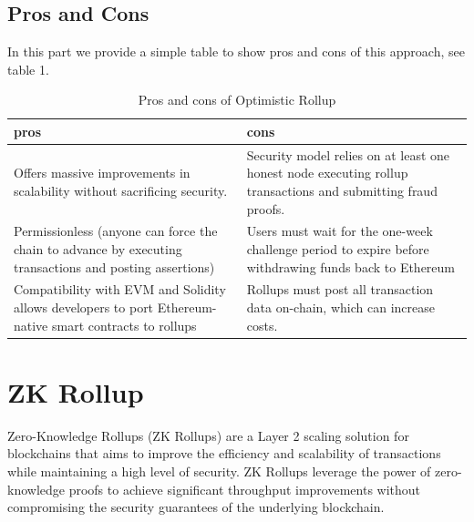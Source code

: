\subsection{Pros and Cons}
In this part we provide a simple table to show pros and cons of this approach, see table 1.
\begin{table}[htbp]
	\centering
	\captionsetup{justification=centering}
	\caption[position=above]{Pros and cons of Optimistic Rollup}
	\begin{tabular}{|>{\centering\arraybackslash}p{8cm}|>{\centering\arraybackslash}p{8cm}|}
		\hline
		\textbf{pros} & \textbf{cons}\\
		\hline
		Offers massive improvements in scalability without sacrificing security.
		& Security model relies on at least one honest node executing rollup transactions and submitting fraud proofs.\\
		\hline
		Permissionless (anyone can force the chain to advance by executing transactions and posting assertions) & Users must wait for the one-week challenge period to expire before withdrawing funds back to Ethereum \\
		\hline
		Compatibility with EVM and Solidity allows developers to port Ethereum-native smart contracts to rollups & Rollups must post all transaction data on-chain, which can increase costs. \\
		\hline
	\end{tabular}
\end{table}
\section{ZK Rollup}
Zero-Knowledge Rollups (ZK Rollups) are a Layer 2 scaling solution for blockchains that aims to improve the efficiency and scalability of transactions while maintaining a high level of security. ZK Rollups leverage the power of zero-knowledge proofs to achieve significant throughput improvements without compromising the security guarantees of the underlying blockchain.
